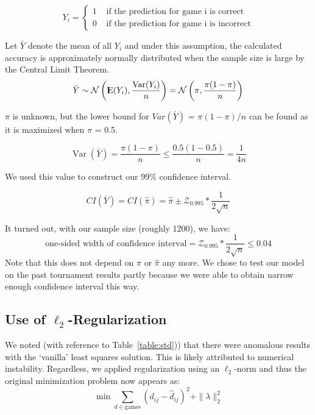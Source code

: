 \documentclass{article} %
\newcommand{\E}{{\rm I\kern-.3em E}}
\newcommand{\norm}{\mathcal{N}}
\newcommand{\Z}{\mathcal{Z}}
\DeclareMathOperator{\Var}{Var}
\begin{document}
\begin{equation}
	Y_i = \left\{\begin{matrix}
		1&\text{ if the prediction for game i is correct} \\
		0&\text{ if the prediction for game i is incorrect}
	\end{matrix}\right.
\end{equation}

Let $\bar{Y}$ denote the mean of all $Y_i$ and under this assumption, the calculated accuracy is approximately normally distributed when the sample size is large by the Central Limit Theorem.
\begin{equation}
		\bar{Y} \sim \norm\left(\E(Y_i), \frac{\Var(Y_i)}{n}\right) = \norm\left(\pi, \frac{\pi(1-\pi)}{n}\right)
\end{equation}

$\pi$ is unknown, but the lower bound for $Var(\bar{Y})$ = $\pi(1-\pi)/n$ can be found as it is maximized when $\pi$ = 0.5.

\begin{equation}
		\Var(\bar{Y}) = \frac{\pi(1-\pi)}{n} \leq \frac{0.5(1-0.5)}{n} = \frac{1}{4n}
\end{equation}

We used this value to construct our 99\% confidence interval.

\begin{equation}
		CI(\bar{Y}) = CI(\hat{\pi}) = \hat{\pi} \pm \Z_{0.995} *  \frac{1}{2\sqrt{n}}
\end{equation}

It turned out, with our sample size (roughly 1200), we have:
\begin{equation}
		\mbox{one-sided width of confidence interval} = \Z_{0.995} *  \frac{1}{2\sqrt{n}} \leq 0.04
\end{equation}
Note that this does not depend on $\pi$ or $\hat{\pi}$ any more.  We chose to test our model on the past tournament results partly because we were able to obtain narrow enough confidence interval this way.

\subsection{Use of $\ell_2$-Regularization}\label{sec:l2}
We noted (with reference to Table~\ref{table:std})) that there were anomalous results with the `vanilla' least squares solution. This is likely attributed to numerical instability. Regardless, we applied regularization using an $\ell_2$-norm and thus the original minimization problem now appears as:
\[
	\min\sum_{d\in\text{games}}\left(d_{ij}-\hat{d}_{ij} \right)^2 + \|\lambda\|_2^2
\]
\end{document}
